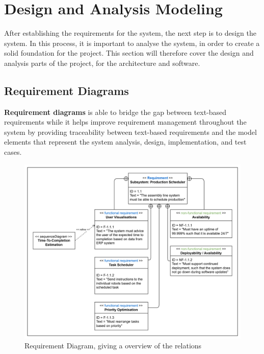 
\section{Design and Analysis Modeling}
\label{sec:design-and-analysis-modelling}

After establishing the requirements for the system, the next step is to design the system. In this process, it is important to analyse the system, in order to create a solid foundation for the project.
This section will therefore cover the design and analysis parts of the project, for the architecture and software.





\subsection{Requirement Diagrams}

\textbf{Requirement diagrams} is able to bridge the gap between text-based requirements while it helps improve requirement management throughout the system by providing traceability between text-based requirements and the model elements that represent the system analysis, design, implementation, and test cases.

\begin{figure}[H]
    \centering
    \caption{\centering Requirement Diagram, giving a overview of the relations}
    \label{fig:requirements-diagram}
    \includegraphics[width=0.9\linewidth]{report/GroupTemplate/images/requirements diagram.png}
\end{figure}

